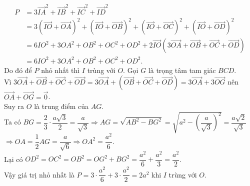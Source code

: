 \begin{ex}
{\begin{enumerate}[a)]
			\begin{align*}
				P& =3\vec{IA}^2+\vec{IB}^2+\vec{IC}^2+\vec{ID}^2 \\
				& =3\left(\vec{IO}+\vec{OA}\right)^2+\left(\vec{IO}+\vec{OB}\right)^2+\left(\vec{IO}+\vec{OC}\right)^2+\left(\vec{IO}+\vec{OD}\right)^2 \\
				& =6IO^2+3OA^2+OB^2+OC^2+OD^2+2\vec{IO}\left(3\vec{OA}+\vec{OB}+\vec{OC}+\vec{OD}\right) \\
				& =6IO^2+3OA^2+OB^2+OC^2+OD^2.
			\end{align*}
			Do đó để $P$ nhỏ nhất thì $I$ trùng với $O$. Gọi $G$ là trọng tâm tam giác $BCD$.\\
			Vì $3\vec{OA}+\vec{OB}+\vec{OC}+\vec{OD}=3\vec{OA}+\left(\vec{OB}+\vec{OC}+\vec{OD}\right) =3\vec{OA}+3\vec{OG}$ nên $\vec{OA}+\vec{OG}=\vec{0}$.\\			
			Suy ra $O$ là trung điểm của $AG$.\\
			Ta có $BG=\dfrac{2}{3} \cdot \dfrac{a\sqrt{3}}{2}=\dfrac{a}{\sqrt{3}}\Rightarrow AG=\sqrt{AB^2-BG^2}=\sqrt{a^2-{{\left(\dfrac{a}{\sqrt{3}}\right)}^2}}=\dfrac{a\sqrt{2}}{\sqrt{3}}$\\
			$\Rightarrow OA=\dfrac{1}{2}AG=\dfrac{a}{\sqrt{6}}\Rightarrow OA^2=\dfrac{a^2}{6}$.\\
			Lại có $OD^2=OC^2=OB^2=OG^2+BG^2=\dfrac{a^2}{6}+\dfrac{a^2}{3}=\dfrac{a^2}{2}$.\\
			Vậy giá trị nhỏ nhất là $P=3 \cdot \dfrac{a^2}{6}+3 \cdot \dfrac{a^2}{2}=2a^2$ khi $I$ trùng với $O$.
		\end{enumerate}
		
	}
\end{ex}

